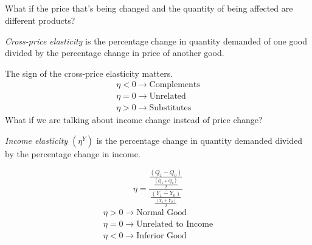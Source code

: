 \subsection{}
What if the price that's being changed and the quantity of being affected are different products?
\begin{definition}
    \emph{Cross-price elasticity} is the percentage change in quantity demanded of one good divided by the percentage change in price of another good.
\end{definition}
The sign of the cross-price elasticity matters.
\begin{gather}
    \eta<0 \rightarrow \text{Complements}\\
    \eta=0 \rightarrow \text{Unrelated}\\
    \eta>0 \rightarrow \text{Substitutes}
\end{gather}
What if we are talking about income change instead of price change?
\begin{definition}
    \emph{Income elasticity $(\eta^Y)$} is the percentage change in quantity demanded divided by the percentage change in income.
\end{definition}
\begin{equation}
    \eta=\frac{
        \frac{(Q_1-Q_0)}{\frac{(Q_1+Q_0)}{2}}}
        {\frac{(Y_1-Y_0)}{\frac{(Y_1+Y_0)}{2}}}
\end{equation}
\begin{gather}
    \eta>0 \rightarrow \text{Normal Good}\\
    \eta=0 \rightarrow \text{Unrelated to Income}\\
    \eta<0 \rightarrow \text{Inferior Good}
\end{gather}